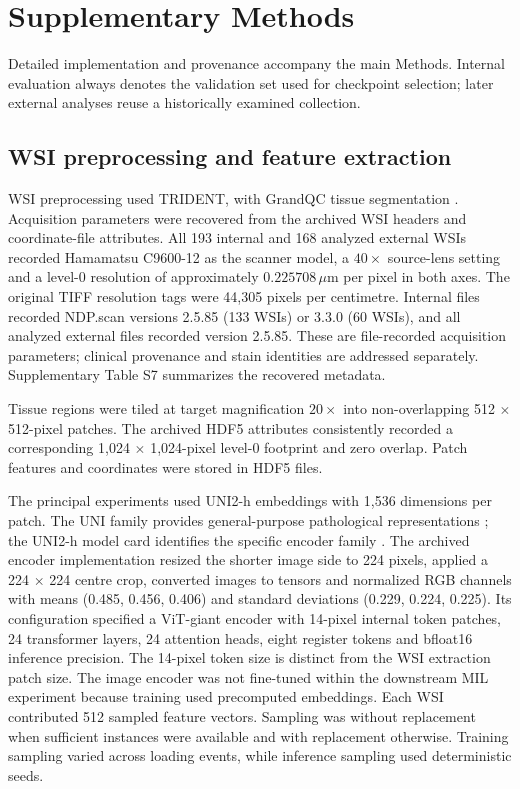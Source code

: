 \section*{Supplementary Methods}
\setcounter{subsection}{0}
\renewcommand{\thesubsection}{SM\arabic{subsection}}
Detailed implementation and provenance accompany the main Methods. Internal evaluation always denotes the validation set used for checkpoint selection; later external analyses reuse a historically examined collection.

\subsection{WSI preprocessing and feature extraction}

WSI preprocessing used TRIDENT, with GrandQC tissue segmentation \citep{ref12}. Acquisition parameters were recovered from the archived WSI headers and coordinate-file attributes. All 193 internal and 168 analyzed external WSIs recorded Hamamatsu C9600-12 as the scanner model, a \(40\times\) source-lens setting and a level-0 resolution of approximately \(0.225708\,\mu\mathrm{m}\) per pixel in both axes. The original TIFF resolution tags were 44,305 pixels per centimetre. Internal files recorded NDP.scan versions 2.5.85 (133 WSIs) or 3.3.0 (60 WSIs), and all analyzed external files recorded version 2.5.85. These are file-recorded acquisition parameters; clinical provenance and stain identities are addressed separately. Supplementary Table S7 summarizes the recovered metadata.

Tissue regions were tiled at target magnification \(20\times\) into non-overlapping 512 \(\times\) 512-pixel patches. The archived HDF5 attributes consistently recorded a corresponding 1,024 \(\times\) 1,024-pixel level-0 footprint and zero overlap. Patch features and coordinates were stored in HDF5 files.

The principal experiments used UNI2-h embeddings with 1,536 dimensions per patch. The UNI family provides general-purpose pathological representations \citep{ref8}; the UNI2-h model card identifies the specific encoder family \citep{ref29}. The archived encoder implementation resized the shorter image side to 224 pixels, applied a 224 \(\times\) 224 centre crop, converted images to tensors and normalized RGB channels with means (0.485, 0.456, 0.406) and standard deviations (0.229, 0.224, 0.225). Its configuration specified a ViT-giant encoder with 14-pixel internal token patches, 24 transformer layers, 24 attention heads, eight register tokens and bfloat16 inference precision. The 14-pixel token size is distinct from the WSI extraction patch size.  The image encoder was not fine-tuned within the downstream MIL experiment because training used precomputed embeddings. Each WSI contributed 512 sampled feature vectors. Sampling was without replacement when sufficient instances were available and with replacement otherwise. Training sampling varied across loading events, while inference sampling used deterministic seeds.

